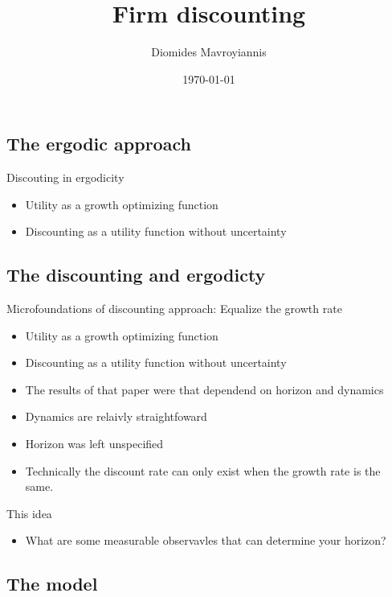 \documentclass{beamer}
\title[Notes on employee project discounting]{Firm discounting} %
\author{Diomides Mavroyiannis} %
\date{\today} %
\numberwithin{equation}{section}
\begin{document}
\begin{frame}
\titlepage %
\end{frame}

\subsection{The ergodic approach}
\begin{frame}{Discouting in ergodicity}
\begin{itemize}
\item Utility as a growth optimizing function
\item Discounting as a utility function without uncertainty
\end{itemize}
\end{frame}

\subsection{The discounting and ergodicty}
\begin{frame}{Microfoundations of discounting approach: Equalize the growth rate}
\begin{itemize}
\item Utility as a growth optimizing function
\item Discounting as a utility function without uncertainty
\item The results of that paper were that dependend on horizon and dynamics
\item Dynamics are relaivly straightfoward
\item Horizon was left unspecified
\item Technically the discount rate can only exist when the growth rate is the same. 
\end{itemize}
\end{frame}

\begin{frame}{This idea }
\begin{itemize}
\item What are some measurable observavles that can determine your horizon?
\end{itemize}
\end{frame}

\subsection{The model}
\end{document}
